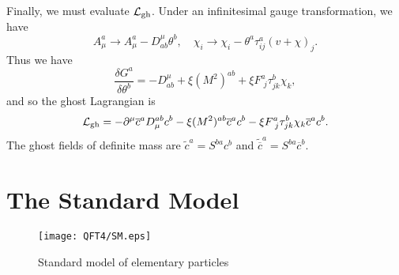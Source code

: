 \\ \\
Finally, we must evaluate $\mathcal{L}_{\rm gh}$. Under an infinitesimal gauge transformation, we have
\[ A^a_{\mu} \to A^a_{\mu} - D^{\mu}_{ab}\theta^b , \quad \chi_i \to \chi_i - \theta^a \tau^a_{ij}(v+\chi)_j .\]
Thus we have
\[\frac{\delta G^a}{\delta \theta^b} = - D^{\mu}_{ab} + \xi(M^2)^{ab} + \xi F^a_{\phantom{i}j} \tau^b_{jk}\chi_k ,\]
and so the ghost Lagrangian is
\[\mathcal{L}_{\rm gh} = -\partial^{\mu} \overline{c}^a D_{\mu}^{ab} c^b - \xi (M^2)^{ab}\overline{c}^a c^b - \xi F^a_{\phantom{i}j} \tau^b_{jk}\chi_k \overline{c}^a c^b.\]
The ghost fields of definite mass are $\widetilde{c}^a = S^{ba}c^b$ and  $\widetilde{\overline{c}}^a = S^{ba}\overline{c}^b$.

\section{The Standard Model}
\begin{figure}[!h]
\centering
\texttt{[image: QFT4/SM.eps]}
\caption{Standard model of elementary particles}
\end{figure}
